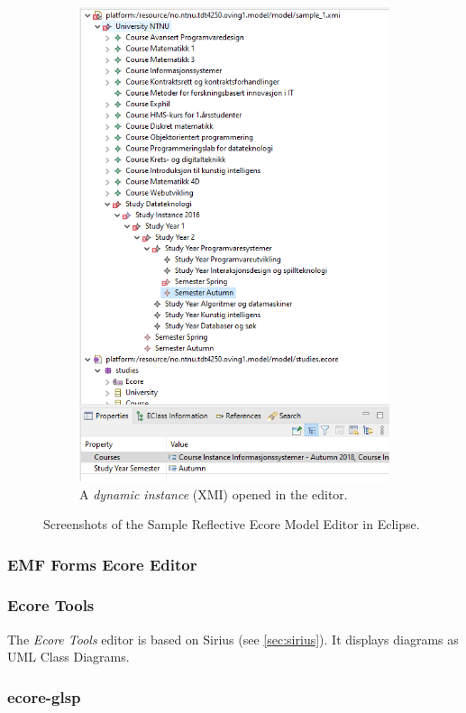 \begin{figure}
\begin{subfigure}[b]{.45\textwidth}
        \includegraphics[width=\textwidth]{figures/ecore-sample-reflective-ecore-model-editor-instance.png}
        \caption{A \emph{dynamic instance} (\gls{XMI}) opened in the editor.}
        \label{sfig:sample-reflective-ecore-model-instance-screenshot}
    \end{subfigure}
    \caption{Screenshots of the Sample Reflective Ecore Model Editor in \gls{Eclipse}.}\label{fig:sample-reflective-ecore-model}
\end{figure}

\subsubsection{EMF Forms Ecore Editor} %

\subsubsection{Ecore Tools} %
The \emph{Ecore Tools} editor is based on Sirius (see \cref{sec:sirius}).
It displays diagrams as \gls{UML} Class Diagrams.

\subsubsection{ecore-glsp} %
